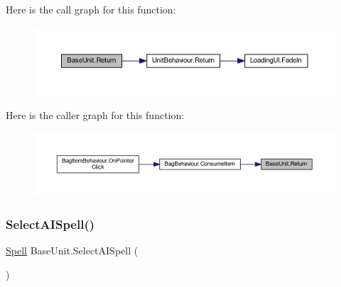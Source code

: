 Here is the call graph for this function\+:\nopagebreak
\begin{figure}[H]
\begin{center}
\leavevmode
\includegraphics[width=350pt]{class_base_unit_a3091e5ab7a6bd3488f9c0987208a1f4d_cgraph}
\end{center}
\end{figure}
Here is the caller graph for this function\+:\nopagebreak
\begin{figure}[H]
\begin{center}
\leavevmode
\includegraphics[width=350pt]{class_base_unit_a3091e5ab7a6bd3488f9c0987208a1f4d_icgraph}
\end{center}
\end{figure}
\mbox{\label{class_base_unit_a94ba01b61de9b22ba2431a47caf13cd5}} 
\subsubsection{\texorpdfstring{SelectAISpell()}{SelectAISpell()}}
{\footnotesize\ttfamily \mbox{\hyperlink{class_spell}{Spell}} Base\+Unit.\+Select\+A\+I\+Spell (\begin{DoxyParamCaption}{ }\end{DoxyParamCaption})}

